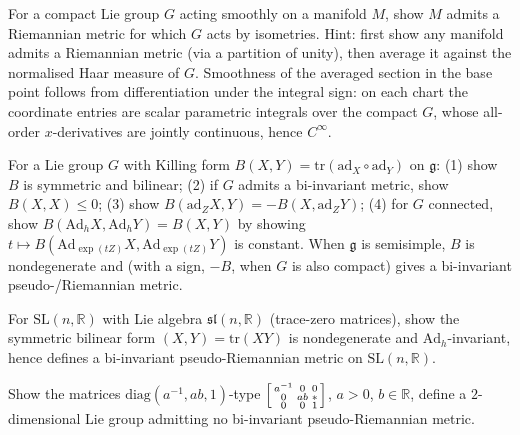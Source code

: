 \begin{remark}
  \label{rem:pet-ch1-ex-26}
  \leanok
  For a compact Lie group $G$ acting smoothly on a manifold $M$, show $M$ admits a
  Riemannian metric for which $G$ acts by isometries. Hint: first show any manifold admits
  a Riemannian metric (via a partition of unity), then average it against the normalised
  Haar measure of $G$. Smoothness of the averaged section in the base point follows from
  differentiation under the integral sign: on each chart the coordinate entries are scalar
  parametric integrals over the compact $G$, whose all-order $x$-derivatives are jointly
  continuous, hence $C^\infty$.
\end{remark}

\begin{remark}
  \label{rem:pet-ch1-ex-27}
  \leanok
  For a Lie group $G$ with Killing form $B(X,Y)=\mathrm{tr}(\mathrm{ad}_X\circ\mathrm{ad}_Y)$
  on $\mathfrak g$: (1) show $B$ is symmetric and bilinear; (2) if $G$ admits a
  bi-invariant metric, show $B(X,X)\le0$; (3) show
  $B(\mathrm{ad}_ZX,Y)=-B(X,\mathrm{ad}_ZY)$; (4) for $G$ connected, show
  $B(\mathrm{Ad}_hX,\mathrm{Ad}_hY)=B(X,Y)$ by showing
  $t\mapsto B(\mathrm{Ad}_{\exp(tZ)}X,\mathrm{Ad}_{\exp(tZ)}Y)$ is constant. When
  $\mathfrak g$ is semisimple, $B$ is nondegenerate and (with a sign, $-B$, when
  $G$ is also compact) gives a bi-invariant pseudo-/Riemannian metric.
\end{remark}

\begin{remark}
  \label{rem:pet-ch1-ex-28}
  \leanok
  For $\mathrm{SL}(n,\mathbb{R})$ with Lie algebra $\mathfrak{sl}(n,\mathbb{R})$ (trace-zero
  matrices), show the symmetric bilinear form $(X,Y)=\mathrm{tr}(XY)$ is
  nondegenerate and $\mathrm{Ad}_h$-invariant, hence defines a bi-invariant
  pseudo-Riemannian metric on $\mathrm{SL}(n,\mathbb{R})$.
\end{remark}

\begin{remark}
  \label{rem:pet-ch1-ex-29}
  \leanok
  Show the matrices $\mathrm{diag}(a^{-1},ab,1)$-type
  $\begin{bsmallmatrix}a^{-1}&0&0\\0&ab&\ast\\0&0&1\end{bsmallmatrix}$, $a>0$,
  $b\in\mathbb{R}$, define a $2$-dimensional Lie group admitting no bi-invariant
  pseudo-Riemannian metric.
\end{remark}
